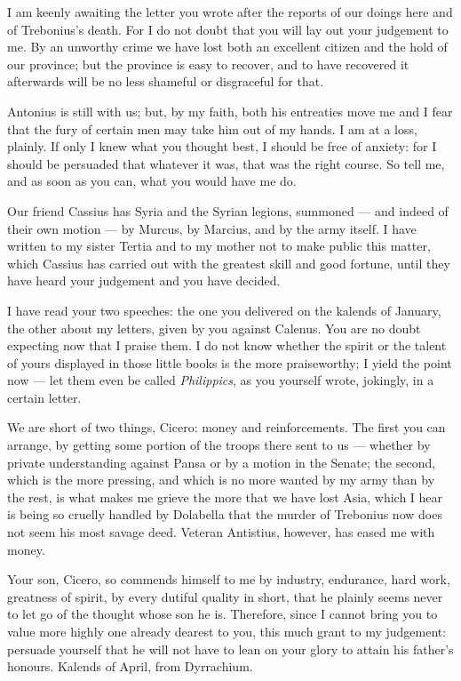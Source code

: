 

 I am keenly awaiting the letter you wrote after the reports of our doings here and of Trebonius's death. For I do not doubt that you will lay out your judgement to me. By an unworthy crime we have lost both an excellent citizen and the hold of our province; but the province is easy to recover, and to have recovered it afterwards will be no less shameful or disgraceful for that.

 Antonius is still with us; but, by my faith, both his entreaties move me and I fear that the fury of certain men may take him out of my hands. I am at a loss, plainly. If only I knew what you thought best, I should be free of anxiety: for I should be persuaded that whatever it was, that was the right course. So tell me, and as soon as you can, what you would have me do.

 Our friend Cassius has Syria and the Syrian legions, summoned --- and indeed of their own motion --- by Murcus, by Marcius, and by the army itself. I have written to my sister Tertia and to my mother not to make public this matter, which Cassius has carried out with the greatest skill and good fortune, until they have heard your judgement and you have decided.

 I have read your two speeches: the one you delivered on the kalends of January, the other about my letters, given by you against Calenus. You are no doubt expecting now that I praise them. I do not know whether the spirit or the talent of yours displayed in those little books is the more praiseworthy; I yield the point now --- let them even be called \textit{Philippics}, as you yourself wrote, jokingly, in a certain letter.

 We are short of two things, Cicero: money and reinforcements. The first you can arrange, by getting some portion of the troops there sent to us --- whether by private understanding against Pansa or by a motion in the Senate; the second, which is the more pressing, and which is no more wanted by my army than by the rest, is what makes me grieve the more that we have lost Asia, which I hear is being so cruelly handled by Dolabella that the murder of Trebonius now does not seem his most savage deed. Veteran Antistius, however, has eased me with money.

 Your son, Cicero, so commends himself to me by industry, endurance, hard work, greatness of spirit, by every dutiful quality in short, that he plainly seems never to let go of the thought whose son he is. Therefore, since I cannot bring you to value more highly one already dearest to you, this much grant to my judgement: persuade yourself that he will not have to lean on your glory to attain his father's honours. Kalends of April, from Dyrrachium.
